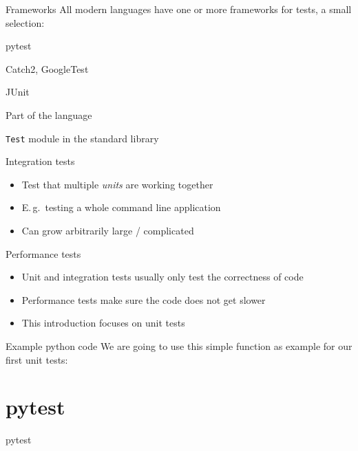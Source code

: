 \documentclass[
  aspectratio=1610,
]{beamer}
\newcommand\headlineframe[1]{%
  \begin{frame}[c]%
    \begin{center}%
      \Huge\color{vertexDarkRed}#1%
    \end{center}%
  \end{frame}%
}%
\begin{document}
\begin{frame}[c]{Frameworks}
  All modern languages have one or more frameworks for tests, a small selection:

  \begin{description}[Python]
    \item[Python] pytest
    \item[C++] Catch2, GoogleTest
    \item[Java] JUnit
    \item[Rust] Part of the language
    \item[Julia] \texttt{Test} module in the standard library
  \end{description}
\end{frame}

\begin{frame}[c]{Integration tests}
  \begin{itemize}
    \item Test that multiple \emph{units} are working together
    \item E.\,g.\ testing a whole command line application
    \item Can grow arbitrarily large / complicated
  \end{itemize}
\end{frame}

\begin{frame}[c]{Performance tests}
  \begin{itemize}
    \item Unit and integration tests usually only test the correctness of code
    \item Performance tests make sure the code does not get slower
    \item This introduction focuses on unit tests
  \end{itemize}
\end{frame}

\begin{frame}[c, fragile]{Example python code}
  We are going to use this simple function as example for our first unit tests:
\end{frame}

\section{pytest}
\headlineframe{pytest}
\end{document}
